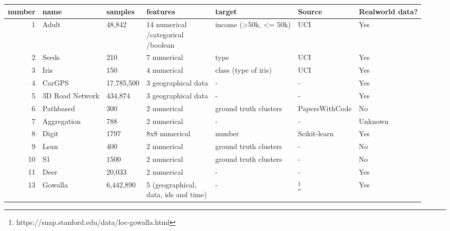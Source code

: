 \begin{landscape}
\begin{table}
    \begin{tabular}{rllllll}
      \toprule
      number & name            & samples    & features                      & target                & Source         & Realworld data? \\
      \midrule
      1      & Adult           & 48,842     & \makecell[l]{14 numerical                                                                \\ /categorical \\ /boolean}    & income (>50k, <= 50k) & UCI                                             & Yes             \\
      2      & Seeds           & 210        & 7 numerical                   & type                  & UCI            & Yes             \\
      3      & Iris            & 150        & 4 numerical                   & class (type of iris)  & UCI            & Yes             \\
      4      & CarGPS          & 17,785,500 & 3 geographical data           & -                     & -              & Yes             \\
      5      & 3D Road Network & 434,874    & 3 geographical data           & -                     & -              & Yes             \\
      6      & Pathbased       & 300        & 2 numerical                   & ground truth clusters & PapersWithCode & No              \\
      7      & Aggregation     & 788        & 2 numerical                   & -                     & -              & Unknown         \\
      8      & Digit           & 1797       & 8x8 numerical                 & number                & Scikit-learn   & Yes             \\
      9      & Lsun            & 400        & 2 numerical                   & ground truth clusters & -              & No              \\
      10     & S1              & 1500       & 2 numerical                   & ground truth clusters & -              & No              \\
      11     & Deer            & 20,033     & 2 numerical                   & -                     & -              & Yes             \\
      13     & Gowalla         & 6,442,890  & \makecell[l]{5 (geographical,                                                            \\ data, ids and time)} & -  & \footnote{https://snap.stanford.edu/data/loc-gowalla.html} & Yes             \\

\end{tabular}
\end{table}
\end{landscape}
